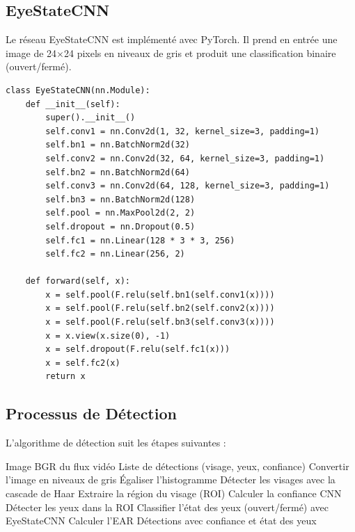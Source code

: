 \documentclass[12pt,a4paper]{report}
\begin{document}
\subsection{EyeStateCNN}

Le réseau EyeStateCNN est implémenté avec PyTorch. Il prend en entrée une image de 24$\times$24 pixels en niveaux de gris et produit une classification binaire (ouvert/fermé).

\begin{lstlisting}[caption={Architecture du EyeStateCNN (PyTorch).}]
class EyeStateCNN(nn.Module):
    def __init__(self):
        super().__init__()
        self.conv1 = nn.Conv2d(1, 32, kernel_size=3, padding=1)
        self.bn1 = nn.BatchNorm2d(32)
        self.conv2 = nn.Conv2d(32, 64, kernel_size=3, padding=1)
        self.bn2 = nn.BatchNorm2d(64)
        self.conv3 = nn.Conv2d(64, 128, kernel_size=3, padding=1)
        self.bn3 = nn.BatchNorm2d(128)
        self.pool = nn.MaxPool2d(2, 2)
        self.dropout = nn.Dropout(0.5)
        self.fc1 = nn.Linear(128 * 3 * 3, 256)
        self.fc2 = nn.Linear(256, 2)

    def forward(self, x):
        x = self.pool(F.relu(self.bn1(self.conv1(x))))
        x = self.pool(F.relu(self.bn2(self.conv2(x))))
        x = self.pool(F.relu(self.bn3(self.conv3(x))))
        x = x.view(x.size(0), -1)
        x = self.dropout(F.relu(self.fc1(x)))
        x = self.fc2(x)
        return x
\end{lstlisting}

\subsection{Processus de Détection}

L'algorithme de détection suit les étapes suivantes :

\begin{algorithm}[H]
    \caption{Algorithme de détection du visage et des yeux}
    \label{alg:detection}
    \begin{algorithmic}[1]
        \REQUIRE Image BGR du flux vidéo
        \ENSURE Liste de détections (visage, yeux, confiance)
        \STATE Convertir l'image en niveaux de gris
        \STATE Égaliser l'histogramme
        \STATE Détecter les visages avec la cascade de Haar
            \STATE Extraire la région du visage (ROI)
            \STATE Calculer la confiance CNN
            \STATE Détecter les yeux dans la ROI
                \STATE Classifier l'état des yeux (ouvert/fermé) avec EyeStateCNN
                \STATE Calculer l'EAR
            \ENDIF
        \ENDFOR
        \RETURN Détections avec confiance et état des yeux
    \end{algorithmic}
\end{algorithm}
\end{document}

